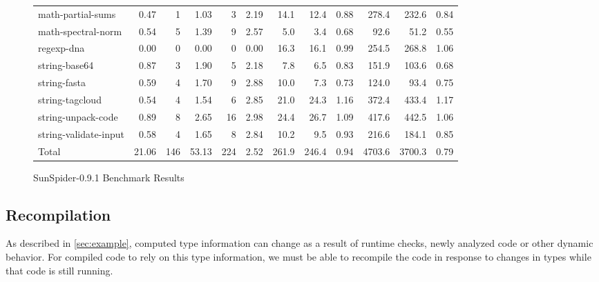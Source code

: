 \begin{figure*}[ht]
\begin{tabular}{lrrrrrrrrrrr}
math-partial-sums        & 0.47 & 1   & 1.03 & 3  & 2.19
    & 14.1 & 12.4 & 0.88  & 278.4 & 232.6 & 0.84 \\
math-spectral-norm       & 0.54 & 5   & 1.39 & 9  & 2.57
    & 5.0  & 3.4 & 0.68   & 92.6  & 51.2  & 0.55 \\
regexp-dna               & 0.00 & 0   & 0.00 & 0    & 0.00
    & 16.3 & 16.1 & 0.99  & 254.5 & 268.8 & 1.06 \\
string-base64            & 0.87 & 3   & 1.90 & 5   & 2.18
    & 7.8  & 6.5 & 0.83   & 151.9 & 103.6 & 0.68 \\
string-fasta             & 0.59 & 4   & 1.70 & 9   & 2.88
    & 10.0 & 7.3 & 0.73   & 124.0 & 93.4  & 0.75 \\
string-tagcloud          & 0.54 & 4   & 1.54 & 6  & 2.85
    & 21.0 & 24.3 & 1.16 & 372.4 & 433.4 & 1.17 \\
string-unpack-code       & 0.89 & 8   & 2.65 & 16 & 2.98
    & 24.4 & 26.7 & 1.09 & 417.6 & 442.5 & 1.06 \\
string-validate-input    & 0.58 & 4   & 1.65 & 8  & 2.84
    & 10.2 & 9.5 & 0.93   & 216.6 & 184.1 & 0.85 \\

\midrule

Total                  & 21.06 & 146 & 53.13 & 224 & 2.52
    & 261.9 & 246.4 & 0.94 & 4703.6 & 3700.3 & 0.79 \\

\bottomrule

\end{tabular}
\nocaptionrule \caption{SunSpider-0.9.1 Benchmark Results}
\label{fig:sunspider}
\end{figure*}

\subsection{Recompilation}
\label{sec:recompilation}

As described in \Section\ref{sec:example}, computed type information can change as
a result of runtime checks, newly analyzed code or other dynamic behavior.
For compiled code to rely on this type information, we must be able
to recompile the code in response to changes in types while that code is
still running.


